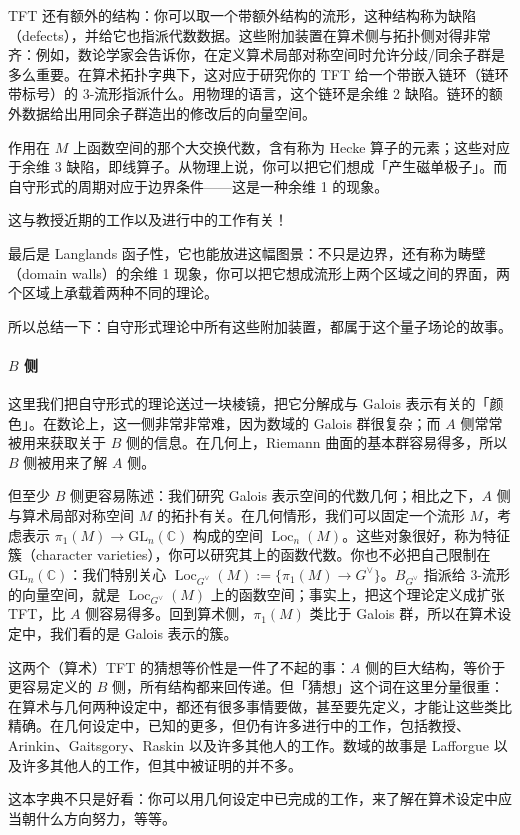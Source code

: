 TFT 还有额外的结构：你可以取一个带额外结构的流形，这种结构称为缺陷（defects），并给它也指派代数数据。这些附加装置在算术侧与拓扑侧对得非常齐：例如，数论学家会告诉你，在定义算术局部对称空间时允许分歧/同余子群是多么重要。在算术拓扑字典下，这对应于研究你的 TFT 给一个带嵌入链环（链环带标号）的 3-流形指派什么。用物理的语言，这个链环是余维 2 缺陷。链环的额外数据给出用同余子群造出的修改后的向量空间。

作用在 $M$ 上函数空间的那个大交换代数，含有称为 Hecke 算子的元素；这些对应于余维 3 缺陷，即线算子。从物理上说，你可以把它们想成「产生磁单极子」。而自守形式的周期对应于边界条件——这是一种余维 1 的现象。


这与教授近期的工作以及进行中的工作有关！

最后是 Langlands 函子性，它也能放进这幅图景：不只是边界，还有称为畴壁（domain walls）的余维 1 现象，你可以把它想成流形上两个区域之间的界面，两个区域上承载着两种不同的理论。

所以总结一下：自守形式理论中所有这些附加装置，都属于这个量子场论的故事。

\paragraph{$B$ 侧}

这里我们把自守形式的理论送过一块棱镜，把它分解成与 Galois 表示有关的「颜色」。在数论上，这一侧非常非常难，因为数域的 Galois 群很复杂；而 $A$ 侧常常被用来获取关于 $B$ 侧的信息。在几何上，Riemann 曲面的基本群容易得多，所以 $B$ 侧被用来了解 $A$ 侧。

但至少 $B$ 侧更容易陈述：我们研究 Galois 表示空间的代数几何；相比之下，$A$ 侧与算术局部对称空间 $M$ 的拓扑有关。在几何情形，我们可以固定一个流形 $M$，考虑表示 $\pi_1(M)\to\mathrm{GL}_n(\mathbb{C})$ 构成的空间 $\operatorname{Loc}_n(M)$。这些对象很好，称为特征簇（character varieties），你可以研究其上的函数代数。你也不必把自己限制在 $\mathrm{GL}_n(\mathbb{C})$：我们特别关心 $\operatorname{Loc}_{G^\vee}(M):=\{\pi_1(M)\to G^\vee\}$。$B_{G^\vee}$ 指派给 3-流形的向量空间，就是 $\operatorname{Loc}_{G^\vee}(M)$ 上的函数空间；事实上，把这个理论定义成扩张 TFT，比 $A$ 侧容易得多。回到算术侧，$\pi_1(M)$ 类比于 Galois 群，所以在算术设定中，我们看的是 Galois 表示的簇。

这两个（算术）TFT 的猜想等价性是一件了不起的事：$A$ 侧的巨大结构，等价于更容易定义的 $B$ 侧，所有结构都来回传递。但「猜想」这个词在这里分量很重：在算术与几何两种设定中，都还有很多事情要做，甚至要先定义，才能让这些类比精确。在几何设定中，已知的更多，但仍有许多进行中的工作，包括教授、Arinkin、Gaitsgory、Raskin 以及许多其他人的工作。数域的故事是 Lafforgue 以及许多其他人的工作，但其中被证明的并不多。

这本字典不只是好看：你可以用几何设定中已完成的工作，来了解在算术设定中应当朝什么方向努力，等等。
